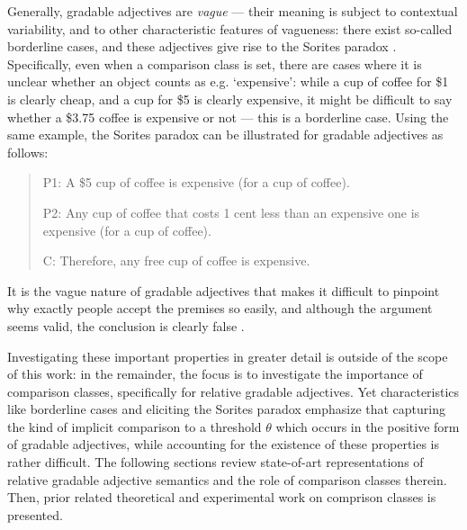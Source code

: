 Generally, gradable adjectives are \textit{vague} --- their meaning is subject to contextual variability, and to other characteristic features of vagueness: there exist so-called borderline cases, and these adjectives give rise to the Sorites paradox \parencite{Kennedy2007}. Specifically, even when a comparison class is set, there are cases where it is unclear whether an object counts as e.g. ‘expensive’: while a cup of coffee for \$1 is clearly cheap, and a cup for \$5 is clearly expensive, it might be difficult to say whether a  \$3.75 coffee is expensive or not --- this is a borderline case. Using the same example, the Sorites paradox can be illustrated for gradable adjectives as follows: 
\begin{quotation}
P1: A \$5 cup of coffee is expensive (for a cup of coffee). 

P2: Any cup of coffee that costs 1 cent less than an expensive one is expensive (for a cup of coffee). 

C: Therefore, any free cup of coffee is expensive. 
\end{quotation}

It is the vague nature of gradable adjectives that makes it difficult to pinpoint why exactly people accept the premises so easily, and although the argument seems valid, the conclusion is clearly false \parencite[see][for more details]{Kennedy2007}.

Investigating these important properties in greater detail is outside of the scope of this work: in the remainder, the focus is to investigate the importance of comparison classes, specifically for relative gradable adjectives. Yet characteristics like borderline cases and eliciting the Sorites paradox emphasize that capturing the kind of implicit comparison to a threshold $\theta$ which occurs in the positive form of gradable adjectives, while accounting for the existence of these properties is rather difficult. 
The following sections review state-of-art representations of relative gradable adjective semantics and the role of comparison classes therein. Then, prior related theoretical and experimental work on comprison classes is presented. 

